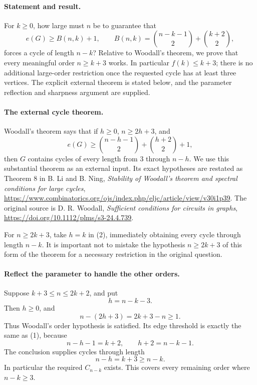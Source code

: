 \paragraph{Statement and result.}
For \(k\geq0\), how large must \(n\) be to guarantee that
\[
 e(G)\geq B(n,k)+1,\qquad
 B(n,k)=\binom{n-k-1}{2}+\binom{k+2}{2},
\tag{1}
\]
forces a cycle of length \(n-k\)? Relative to Woodall's theorem, we prove that every meaningful order \(n\geq k+3\) works. In particular \(f(k)\leq k+3\); there is no additional large-order restriction once the requested cycle has at least three vertices. The explicit external theorem is stated below, and the parameter reflection and sharpness argument are supplied.

\paragraph{The external cycle theorem.}
Woodall's theorem says that if \(h\geq0\), \(n\geq2h+3\), and
\[
 e(G)\geq\binom{n-h-1}{2}+\binom{h+2}{2}+1,
\tag{2}
\]
then \(G\) contains cycles of every length from \(3\) through \(n-h\). We use this substantial theorem as an external input. Its exact hypotheses are restated as Theorem 8 in B. Li and B. Ning, \emph{Stability of Woodall's theorem and spectral conditions for large cycles}, \url{https://www.combinatorics.org/ojs/index.php/eljc/article/view/v30i1p39}. The original source is D. R. Woodall, \emph{Sufficient conditions for circuits in graphs}, \url{https://doi.org/10.1112/plms/s3-24.4.739}.

For \(n\geq2k+3\), take \(h=k\) in (2), immediately obtaining every cycle through length \(n-k\). It is important not to mistake the hypothesis \(n\geq2k+3\) of this form of the theorem for a necessary restriction in the original question.

\paragraph{Reflect the parameter to handle the other orders.}
Suppose \(k+3\leq n\leq2k+2\), and put
\[
 h=n-k-3.
\]
Then \(h\geq0\), and
\[
 n-(2h+3)=2k+3-n\geq1.
\]
Thus Woodall's order hypothesis is satisfied. Its edge threshold is exactly the same as (1), because
\[
 n-h-1=k+2,\qquad h+2=n-k-1.
\]
The conclusion supplies cycles through length
\[
 n-h=k+3\geq n-k.
\]
In particular the required \(C_{n-k}\) exists. This covers every remaining order where \(n-k\geq3\).

